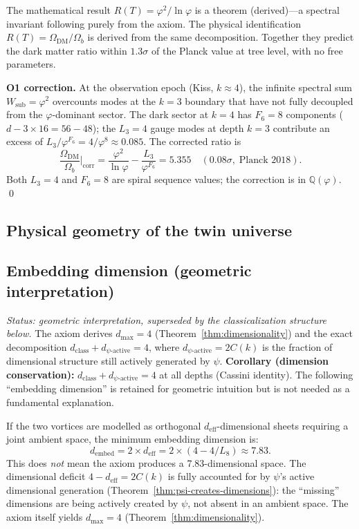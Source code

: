\documentclass[12pt,a4paper]{article}
\begin{document}
The mathematical result $R(T) = \varphi^2/\ln\varphi$ is a theorem (derived)---a spectral invariant following purely from the axiom. The physical identification $R(T) = \Omega_{\mathrm{DM}}/\Omega_b$ is derived from the same decomposition. Together they predict the dark matter ratio within $1.3\sigma$ of the Planck value at tree level, with no free parameters.

\textbf{O1 correction.} At the observation epoch (Kiss, $k \approx 4$), the infinite spectral sum $W_{\mathrm{sub}} = \varphi^2$ overcounts modes at the $k = 3$ boundary that have not fully decoupled from the $\varphi$-dominant sector. The dark sector at $k = 4$ has $F_6 = 8$ components ($d - 3\times 16 = 56 - 48$); the $L_3 = 4$ gauge modes at depth $k = 3$ contribute an excess of $L_3/\varphi^{F_6} = 4/\varphi^8 \approx 0.085$. The corrected ratio is
\begin{equation}
\frac{\Omega_{\mathrm{DM}}}{\Omega_b}\bigg|_{\mathrm{corr}} = \frac{\varphi^2}{\ln\varphi} - \frac{L_3}{\varphi^{F_6}} = 5.355 \quad (0.08\sigma,\;\text{Planck 2018}). \label{eq:OmDM-O1}
\end{equation}
Both $L_3 = 4$ and $F_6 = 8$ are spiral sequence values; the correction is in $\mathbb{Q}(\varphi)$. \qed


\subsection{Physical geometry of the twin universe}
\label{sec:twin-geometry}
\label{sec:geometry}

\subsection{Embedding dimension (geometric interpretation)}
\label{sec:d-embed-interp}

\noindent\textit{Status: geometric interpretation, superseded by the classicalization structure below.}\; The axiom derives $d_{\max} = 4$ (Theorem~\ref{thm:dimensionality}) and the exact decomposition $d_{\mathrm{class}} + d_{\psi\text{-active}} = 4$, where $d_{\psi\text{-active}} = 2C(k)$ is the fraction of dimensional structure still actively generated by $\psi$. \textbf{Corollary (dimension conservation):} \label{cor:dim-conservation} $d_{\mathrm{class}} + d_{\psi\text{-active}} = 4$ at all depths (Cassini identity).  The following ``embedding dimension'' is retained for geometric intuition but is not needed as a fundamental explanation.

If the two vortices are modelled as orthogonal $d_{\mathrm{eff}}$-dimensional sheets requiring a joint ambient space, the minimum embedding dimension is:
\begin{equation}
d_{\mathrm{embed}} = 2 \times d_{\mathrm{eff}} = 2 \times (4 - 4/L_8) \approx 7.83.
\end{equation}
This does \emph{not} mean the axiom produces a 7.83-dimensional space.  The dimensional deficit $4 - d_{\mathrm{eff}} = 2C(k)$ is fully accounted for by $\psi$'s active dimensional generation (Theorem~\ref{thm:psi-creates-dimensions}): the ``missing'' dimensions are being actively created by $\psi$, not absent in an ambient space.  The axiom itself yields $d_{\max} = 4$ (Theorem~\ref{thm:dimensionality}).
\end{document}
